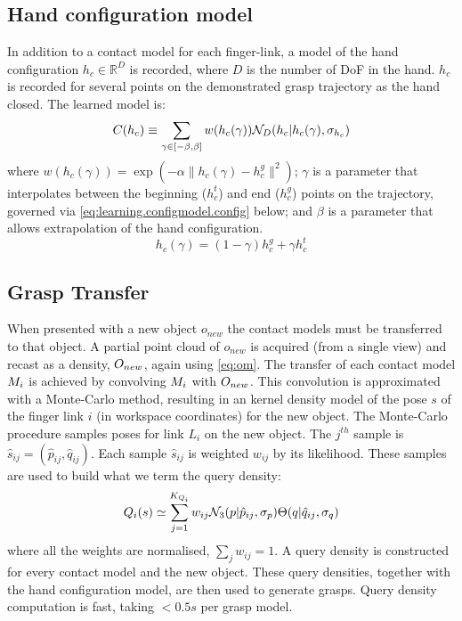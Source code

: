 \subsection{Hand configuration model}
In addition to a contact model for each finger-link, a model of the hand configuration $h_c \in \mathbb R^D$ is recorded, where $D$ is the number of DoF in the hand. $h_c$  is recorded for several points on the demonstrated grasp trajectory as the hand closed. The learned model is:
\begin{equation}
\hc(h_c) \equiv \sum_{\gamma \in [-\beta, \beta]} w({h_c(\gamma)}) \mathcal{N}_D(h_c|h_c(\gamma), \sigma_{h_c}) 
\label{eq:hc}
\end{equation}
where $w({h_c(\gamma)}) = \exp(-\alpha \|h_c(\gamma) - h^g_c \|^2)$; $\gamma$ is a parameter that interpolates between the beginning ($h^t_c$) and end ($h^g_c$) points on the trajectory, governed via \eq\ref{eq:learning.configmodel.config} below; and $\beta$ is a parameter that allows extrapolation of the hand configuration.
\begin{equation}
h_c(\gamma) = (1 - \gamma)h^g_c + \gamma h^t_c
\label{eq:learning.configmodel.config}
\end{equation}
\subsection{Grasp Transfer}
When presented with a new object $o_{new}$ the contact models must be transferred to that object. A partial point cloud of $o_{new}$ is acquired (from a single view) and recast as a density, $O_{new}$, again using \eq \ref{eq:om}. The transfer of each contact model $M_i$ is achieved by convolving $M_i$ with $O_{new}$. This convolution is approximated with a Monte-Carlo method, resulting in an kernel density model of the pose $s$ of the finger link $i$ (in workspace coordinates) for the new object. The Monte-Carlo procedure samples poses for link $L_i$ on the new object. The $j^{th}$ sample is $\hat{s}_{ij}=(\hat{p}_{ij},\hat{q}_{ij})$. Each sample $\hat{s}_{ij}$ is weighted $w_{ij}$ by its likelihood. These samples are used to build what we term the query density:
\begin{equation}
\qd_i(s) \simeq \sum^{K_{Q_i}}_{j=1} w_{ij} \mathcal{N}_3(p|{\hat{p}_{ij}}, \sigma_{p}) \Theta(q|{\hat{q}_{ij}}, \sigma_{q})%
\label{eq:qd.approx}
\end{equation}
where all the weights are normalised, $\sum_j w_{ij} = 1$. A query density is constructed for every contact model and the new object. These query densities, together with the hand configuration model, are then used to generate grasps. Query density computation is fast, taking $<0.5s$  per grasp model.

